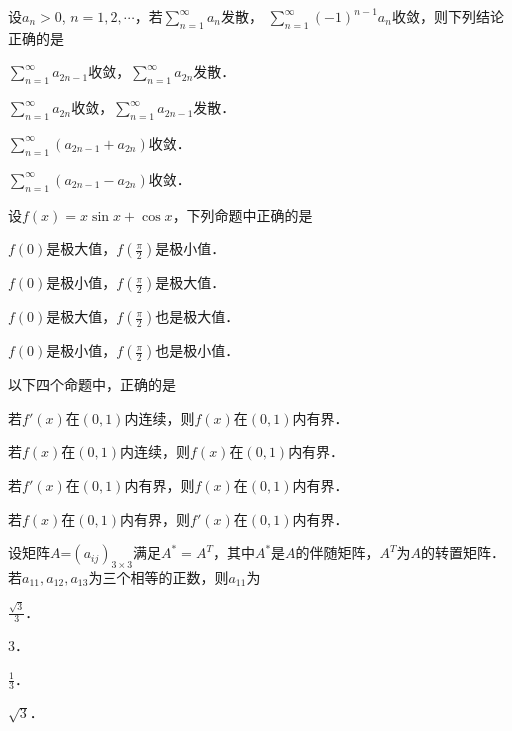 \documentclass[plain,noanswer,medmath]{../../template/jnuexam}
\begin{document}
\begin{problem}
设$a_n > 0$, $n = 1,2, \cdots$，若$\sum_{n = 1}^{\infty}a_n$发散，
$\sum_{n = 1}^{\infty}(- 1)^{n - 1}a_n$收敛，则下列结论正确的是\pickout{}
\begin{abcd}
\item $\sum_{n = 1}^{\infty}a_{2n - 1}$收敛，$\sum_{n = 1}^{\infty}a_{2n}$发散．
\item $\sum_{n = 1}^{\infty}a_{2n}$收敛，$\sum_{n = 1}^{\infty}a_{2n - 1}$发散．
\item $\sum_{n = 1}^{\infty}(a_{2n - 1} + a_{2n})$收敛．
\item $\sum_{n = 1}^{\infty}(a_{2n - 1} - a_{2n})$收敛．
\end{abcd}
\end{problem}


\begin{problem}
设$f(x) = x\sin x + \cos x$，下列命题中正确的是\pickout{}
\begin{abcd}
\item $f(0)$是极大值，$f(\frac{\pi}{2})$是极小值．
\item $f(0)$是极小值，$f(\frac{\pi}{2})$是极大值．
\item $f(0)$是极大值，$f(\frac{\pi}{2})$也是极大值．
\item $f(0)$是极小值，$f(\frac{\pi}{2})$也是极小值．
\end{abcd}
\end{problem}


\begin{problem}
以下四个命题中，正确的是\pickout{}
\begin{abcd}
\item 若$f'(x)$在$(0,1)$内连续，则$f(x)$在$(0,1)$内有界．
\item 若$f(x)$在$(0,1)$内连续，则$f(x)$在$(0,1)$内有界．
\item 若$f'(x)$在$(0,1)$内有界，则$f(x)$在$(0,1)$内有界．
\item 若$f(x)$在$(0,1)$内有界，则$f'(x)$在$(0,1)$内有界．
\end{abcd}
\end{problem}


\begin{problem}
设矩阵$A$=$(a_{ij})_{3 \times 3}$满足$A^* = A^T$，其中$A^*$是$A$的伴随矩阵，$A^T$为$A$的转置矩阵．
若$a_{11},a_{12},a_{13}$为三个相等的正数，则$a_{11}$为\pickout{}
\begin{abcd}
\item $\frac{\sqrt{3}}{3}$．
\item $3$．
\item $\frac{1}{3}$．
\item $\sqrt{3}$．
\end{abcd}
\end{problem}
\end{document}
